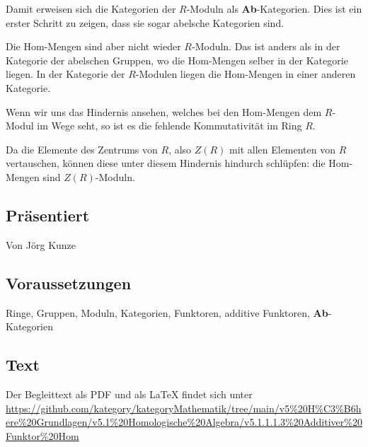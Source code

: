 \documentclass[a4paper]{amsart}
\theoremstyle{definition}
\begin{document}
Damit erweisen sich die Kategorien der $R$-Moduln als \textbf{Ab}-Kategorien. Dies ist ein erster Schritt zu zeigen, dass sie sogar abelsche Kategorien sind.

Die Hom-Mengen sind aber nicht wieder $R$-Moduln. Das ist anders als in der Kategorie der abelschen Gruppen, wo die Hom-Mengen selber in der Kategorie liegen. In der Kategorie der $R$-Modulen liegen die Hom-Mengen in einer anderen Kategorie.

Wenn wir uns das Hindernis ansehen, welches bei den Hom-Mengen dem $R$-Modul im Wege seht, so ist es die fehlende Kommutativität im Ring $R$.

Da die Elemente des Zentrums von $R$, also $Z(R)$ mit allen Elementen von $R$ vertauschen, können diese unter diesem Hindernis hindurch schlüpfen: die Hom-Mengen sind $Z(R)$-Moduln.

\subsection*{Präsentiert}
Von Jörg Kunze

\subsection*{Voraussetzungen}
Ringe, Gruppen, Moduln, Kategorien, Funktoren, additive Funktoren, \textbf{Ab}-Kategorien

\subsection*{Text}
Der Begleittext als PDF und als LaTeX findet sich unter
{\tiny
   \url{https://github.com/kategory/kategoryMathematik/tree/main/v5%20H%C3%B6here%20Grundlagen/v5.1%20Homologische%20Algebra/v5.1.1.1.3%20Additiver%20Funktor%20Hom}
}

\end{document}
